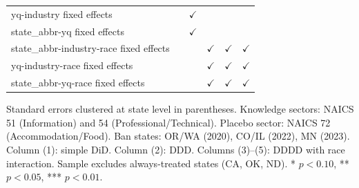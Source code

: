 \begin{tabular}{lccccc}
   yq-industry fixed effects                        &                 & $\checkmark$  &               &               & \\  
   state\_abbr-yq fixed effects                     &                 & $\checkmark$  &               &               & \\  
   state\_abbr-industry-race fixed effects          &                 &               & $\checkmark$  & $\checkmark$  & $\checkmark$\\   
   yq-industry-race fixed effects                   &                 &               & $\checkmark$  & $\checkmark$  & $\checkmark$\\   
   state\_abbr-yq-race fixed effects                &                 &               & $\checkmark$  & $\checkmark$  & $\checkmark$\\   
   \bottomrule
\end{tabular}
 
\par \raggedright 
Standard errors clustered at state level in parentheses. Knowledge sectors: NAICS 51 (Information) and 54 (Professional/Technical). Placebo sector: NAICS 72 (Accommodation/Food). Ban states: OR/WA (2020), CO/IL (2022), MN (2023). Column (1): simple DiD. Column (2): DDD. Columns (3)--(5): DDDD with race interaction. Sample excludes always-treated states (CA, OK, ND). * $p<0.10$, ** $p<0.05$, *** $p<0.01$.
\par\endgroup


